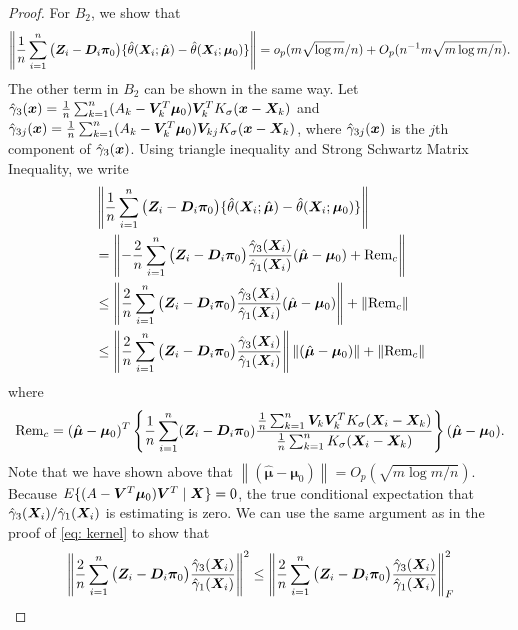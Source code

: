 \documentclass[12pt]{article}
\begin{document}
{\begin{proof}
For $ B_2 $, we show that 
\begin{align}
	\left\|	\frac1n \sum_{i=1}^n  \big( \bm{Z}_i-\bm D_i \bm\pi_0 \big)  \{\hat\theta(\bm{X}_i; \hat{\bm \mu} )   -\hat \theta(\bm{X}_i; \bm \mu_0 ) \} \right\|= o_p(m \sqrt{\log m}/n)+ O_p(n^{-1} m \sqrt{m\log m/n}). \nonumber
\end{align}
The other term in $ B_2 $ can be shown in the same way.  Let $ \hat \gamma_3(\bm x) = \frac1n\sum_{k=1}^{n} (A_k - \bm{V}_k^T \bm\mu_0) \bm{V}_k^T K_\sigma(\bm x- \bm{X}_k) $ and  $ \hat \gamma_{3j}(\bm x) = \frac1n\sum_{k=1}^{n} (A_k - \bm{V}_{k}^T \bm\mu_0) \bm{V}_{kj} K_\sigma(\bm x- \bm{X}_k) $, where $  \hat \gamma_{3j}(\bm x) $ is the $ j $th component of $  \hat \gamma_3(\bm x) $. Using  triangle inequality and Strong Schwartz Matrix Inequality, we write
\begin{align}
&\left\| \frac1n \sum_{i=1}^n  \big( \bm{Z}_i-\bm D_i \bm\pi_0 \big)  \{\hat\theta(\bm{X}_i; \hat{\bm \mu} )   -\hat \theta(\bm{X}_i; \bm \mu_0 ) \}    \right\|\nonumber\\
&= \left\| - \frac2n \sum_{i=1}^n  \big( \bm{Z}_i-\bm D_i \bm\pi_0 \big)  \frac{\hat{\gamma}_3(\bm{X}_i)}{\hat\gamma_1(\bm{X}_i)} (\hat{\bm\mu}- \bm \mu_0)  + \text{Rem}_c\right\|\nonumber \\ 
&\leq  \left\|  \frac2n \sum_{i=1}^n  \big( \bm{Z}_i-\bm D_i \bm\pi_0 \big)  \frac{\hat{\gamma}_3(\bm{X}_i)}{\hat\gamma_1(\bm{X}_i)} (\hat{\bm\mu}- \bm \mu_0) \right\| +\left\| \text{Rem}_c\right\|\nonumber \\ 
&\leq  \left\|  \frac2n \sum_{i=1}^n  \big( \bm{Z}_i-\bm D_i \bm\pi_0 \big)  \frac{\hat{\gamma}_3(\bm{X}_i)}{\hat\gamma_1(\bm{X}_i)} \right\|\left\|(\hat{\bm\mu}- \bm \mu_0) \right\| +\left\| \text{Rem}_c\right\| \label{eq: B2}
\end{align}
where \begin{align*}
	\text{Rem}_c= (\hat{\bm\mu}- \bm\mu_0 )^T  \left\{\frac1n \sum_{i=1}^{n} (\bm{Z}_i - \bm D_i \bm\pi_0 )   \frac{\frac1n \sum_{k=1}^{n} \bm{V}_k \bm{V}_k^T K_\sigma(\bm{X}_i - \bm{X}_k)}{\frac{1}{n} \sum_{k=1}^{n} K_\sigma (\bm{X}_i - \bm{X}_k)} \right\} (\hat{\bm\mu}- \bm\mu_0 ). 
\end{align*}
Note that we have shown above that  $ \left\|(\hat{\bm\mu}- \bm \mu_0) \right\| = O_p(\sqrt{m\log m/n} )$. Because $ E\{(A - \bm{V}^T \bm\mu_0 )\bm{V}^T \mid \bm{X}\} = 0$, the true conditional expectation that $\hat\gamma_3(\bm{X}_i)/\hat\gamma_1(\bm{X}_i) $ is estimating is zero. We
 can use the same argument as in the proof of \eqref{eq: kernel} to show that 
\begin{align*}
	  &\left\|  \frac2n \sum_{i=1}^n  \big( \bmZ_i-\bm D_i \bm\pi_0 \big)  \frac{\hat{\gamma}_3(\bmX_i)}{\hat\gamma_1(\bmX_i)} \right\|^2\leq   \left\|  \frac2n \sum_{i=1}^n  \big( \bmZ_i-\bm D_i \bm\pi_0 \big)  \frac{\hat{\gamma}_3(\bmX_i)}{\hat\gamma_1(\bmX_i)} \right\|_F^2  \\

\end{align*}
\end{proof}}
\end{document}
